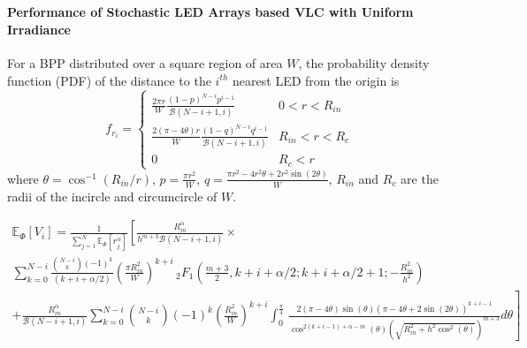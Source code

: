 \documentclass[slidestop,usepdftitle=false]{gvvslides}
\providecommand{\sbrak}[1]{\ensuremath{{}\left[#1\right]}}
\providecommand{\lsbrak}[1]{\ensuremath{{}\left[#1\right.}}
\providecommand{\rsbrak}[1]{\ensuremath{{}\left.#1\right]}}
\providecommand{\brak}[1]{\ensuremath{\left(#1\right)}}
\begin{document}
\begin{frame}
\frametitle{\,}
\framesubtitle{Performance of Stochastic LED Arrays based VLC with Uniform Irradiance}

\begin{list}{}{}

\vfill
\item<1->
\footnotesize{
For a BPP distributed over a square region of area $W$,
the probability density function (PDF) of the distance to the $i^{th}$ nearest LED from the origin
is
%
\begin{equation}
f_{r_i}=\begin{cases} 
      \frac{2\pi r}{W}\frac{\brak{1-p}^{N-i}p^{i-1}}{\mathcal{B}\brak{N-i+1,i}} & 0 < r < R_{in}\\
      \frac{2\brak{\pi-4\theta} r}{W}\frac{\brak{1-q}^{N-i}q^{i-1}}{\mathcal{B}\brak{N-i+1,i}} & R_{in} < r < R_c \\
      0 &  R_c < r
   \end{cases}\nonumber
   \end{equation}
 where $\theta=\cos^{-1}\brak{R_{in}/r}$, $p=\frac{\pi r^2}{W}$, $q=\frac{\pi r^2-4r^2\theta+2 r^2\sin\brak{2\theta}}{W}$, $R_{in}$ and $R_c$ are the radii of the incircle and circumcircle of $W$.
 }
 \vfill

 \item<2>
\tiny{
\begin{multline}
\label{e_phi}
\mathbb{E}_{\Phi}\sbrak{V_i}
= \frac{1}{\sum_{j=1}^N\mathbb{E}_{\Phi}\sbrak{r_j^{\alpha}} }\lsbrak{\frac{R_{in}^{\alpha}}{h^{m+3}\mathcal{B}\brak{N-i+1,i}} \times} \\
\sum_{k=0}^{N-i}\frac{\binom{N-i}{k}(-1)^k}{\brak{k+i+\alpha/2}}\brak{\frac{\pi R_{in}^2}{W}}^{k+i}
   \,_2F_1\brak{\frac{m+3}{2},k+i+\alpha/2;k+i+\alpha/2+1;-\frac{R_{in}^2}{h^2}} 
\\
\rsbrak{+ \frac{R_{in}^{\alpha}}{\mathcal{B}\brak{N-i+1,i}}\sum_{k=0}^{N-i}\binom{N-i}{k}(-1)^k\brak{\frac{R_{in}^2}{W}}^{k+i}
   \int_{0}^{\frac{\pi}{4}} \frac{}{}
   \frac{2\brak{\pi-4\theta}\sin\brak{\theta}\brak{\pi -4\theta+2\sin\brak{2\theta}}^{k+i-1}}{\cos^{2\brak{k+i-1}+\alpha-m}\brak{\theta}\brak{\sqrt{R_{in}^2+h^2\cos^2\brak{\theta}}}^{m+3}} d \theta  }\nonumber
\end{multline}
}
 \end{list}
 
\end{frame}
\end{document}
